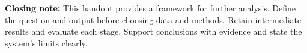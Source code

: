 \documentclass[11pt,a4paper,oneside]{report}
\begin{document}
\begin{heroBox}
\textbf{Closing note:}\quad
This handout provides a framework for further analysis. Define the question and output before choosing data and methods. Retain intermediate results and evaluate each stage. Support conclusions with evidence and state the system's limits clearly.
\end{heroBox}
\end{document}
